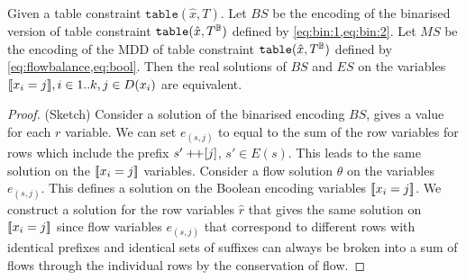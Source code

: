 \documentclass[a4paper,UKenglish,cleveref,autoref,thm-restate]{lipics-v2021}
\begin{document}
\setcounter{theorem}{6}
\begin{theorem}
   Given a table constraint $\texttt{table}(\hat{x},T)$.
    Let $BS$ be the encoding of the binarised version of  table constraint $\texttt{table}(\hat{x},T^{\mathbb{B}})$  defined
    by \cref{eq:bin:1,eq:bin:2}.
    Let $MS$ be the encoding of the MDD of  table constraint $\texttt{table}(\hat{x},T^{\mathbb{B}})$  defined
    by \cref{eq:flowbalance,eq:bool}.
    Then the real solutions of $BS$ and $ES$ on the variables 
    $[\![x_{i} = j]\!], i \in 1..k, j \in D(x_i)$ are equivalent.
\begin{proof}
   (Sketch) Consider a solution of the binarised encoding $BS$, gives a value for each $r$ variable.  We can set 
   $e_{(s,j)}$ to equal to the sum of the row variables for rows which include the prefix $s' +\!\!+ [j]$, $s' \in E(s)$.  This leads to the same solution on the $[\![x_{i} = j]\!]$ variables. 
    Consider a flow solution $\theta$ on the variables $e_{(s,j)}$. This defines a solution on the Boolean encoding variables $[\![x_i = j]\!]$. 
    We construct a solution for the row variables $\hat{r}$ that gives the same solution on $[\![x_i = j]\!]$
    since flow variables $e_{(s,j)}$ that correspond to different rows with identical prefixes and identical sets of suffixes can always be broken into a sum of flows through the individual rows by the conservation of flow.
\end{proof}
\end{theorem}

\setcounter{theorem}{10}
\end{document}
